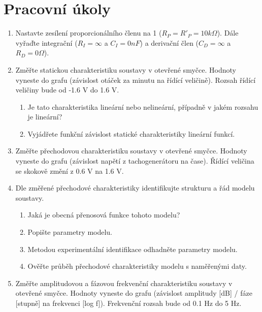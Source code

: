 
\section{Pracovní úkoly}

\begin{enumerate}
\item Nastavte zesílení proporcionálního členu na 1 ($R_P=R'_P=10 \unit{k\Omega}$). Dále vyřaďte integrační ($R_I=\infty$ a $C_I=0 \unit{nF}$) a derivační člen ($C_D=\infty$ a $R_D=0 \unit{\Omega}$).
\item Změřte statickou charakteristiku soustavy v otevřené smyčce. Hodnoty vyneste do grafu (závislost otáček za minutu na řídící veličině). Rozsah řídící veličiny bude od -1.6 V do 1.6 V.
\begin{enumerate}
	\item Je tato charakteristika lineární nebo nelineární, případně v jakém rozsahu je lineární?
	\item Vyjádřete funkční závislost statické charakteristiky lineární funkcí.
\end{enumerate}
\item Změřte přechodovou charakteristiku soustavy v otevřené smyčce. Hodnoty vyneste do grafu (závislost napětí z tachogenerátoru na čase). Řídící veličina se skokově změní z 0.6 V na 1.6 V.
\item Dle změřené přechodové charakteristiky identifikujte strukturu a řád modelu soustavy.
\begin{enumerate}
	\item Jaká je obecná přenosová funkce tohoto modelu?
	\item Popište parametry modelu.
	\item Metodou experimentální identifikace odhadněte parametry modelu.
	\item Ověřte průběh přechodové charakteristiky modelu s naměřenými daty.
\end{enumerate}
\item Změřte amplitudovou a fázovou frekvenční charakteristiku soustavy v otevřené smyčce. Hodnoty vyneste do grafu (závislost amplitudy [dB] / fáze [stupně] na frekvenci [log f]). Frekvenční rozsah bude od 0.1 Hz do 5 Hz.

\end{enumerate}
